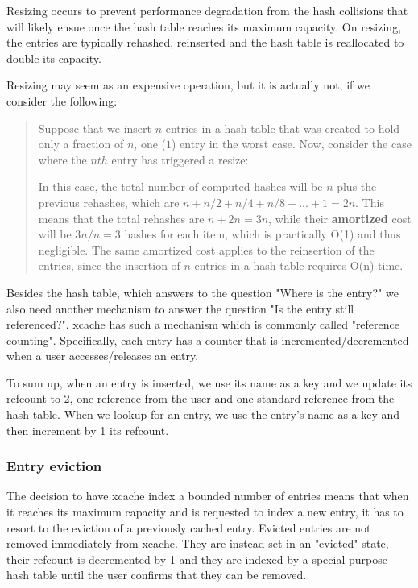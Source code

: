 Resizing occurs to prevent performance degradation from the hash collisions 
that will likely ensue once the hash table reaches its maximum capacity. On 
resizing, the entries are typically rehashed, reinserted and the hash table is 
reallocated to double its capacity.

Resizing may seem as an expensive operation, but it is actually not, if we 
consider the following:
\begin{quotation}
Suppose that we insert \(n\) entries in a hash table that was created to hold 
only a fraction of \(n\), one (\(1\)) entry in the worst case.  Now, consider 
the case where the \(nth\) entry has triggered a resize:

In this case, the total number of computed hashes will be \(n\) plus the 
previous rehashes, which are \(n + n/2 + n/4 + n/8 + ...  + 1 = 2n\).  This 
means that the total rehashes are \(n + 2n = 3n\), while their 
\textbf{amortized} cost will be \(3n/n = 3\) hashes for each item, which is 
practically O(1) and thus negligible. The same amortized cost applies to the 
reinsertion of the entries, since the insertion of \(n\) entries in a hash 
table requires O(n) time.\cite{hash-resize}
\end{quotation}

Besides the hash table, which answers to the question "Where is the entry?" we 
also need another mechanism to answer the question "Is the entry still 
referenced?". xcache has such a mechanism which is commonly called "reference 
counting". Specifically, each entry has a counter that is 
incremented/decremented when a user accesses/releases an entry.

To sum up, when an entry is inserted, we use its name as a key and we update 
its refcount to 2, one reference from the user and one standard reference from 
the hash table. When we lookup for an entry, we use the entry's name as a key 
and then increment by 1 its refcount. 

\subsubsection{Entry eviction}\label{sec:xcache-eviction-design}

The decision to have xcache index a bounded number of entries means that when 
it reaches its maximum capacity and is requested to index a new entry, it has 
to resort to the eviction of a previously cached entry. Evicted entries are not 
removed immediately from xcache. They are instead set in an "evicted" state, 
their refcount is decremented by 1 and they are indexed by a special-purpose 
hash table until the user confirms that they can be removed. 

